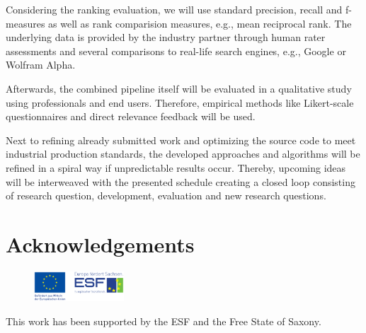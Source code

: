 Considering the ranking evaluation, we will use standard precision, recall and f-measures as well as rank comparision measures, e.g., mean reciprocal rank. 
The underlying data is provided by the industry partner through human rater assessments and several comparisons to real-life search engines, e.g., Google or Wolfram Alpha.

Afterwards, the combined pipeline itself will be evaluated in a qualitative study using professionals and end users.
Therefore, empirical methods like Likert-scale questionnaires and direct relevance feedback will be used.


Next to refining already submitted work and optimizing the source code to meet industrial production standards, the developed approaches and algorithms will be refined in a spiral way if unpredictable results occur.
Thereby, upcoming ideas will be interweaved with the presented schedule creating a closed loop consisting of research question, development, evaluation and new research questions.


\section*{Acknowledgements}
\begin{figure}
 \vspace{-10mm}
 \includegraphics[width=0.3\textwidth]{figures/esf.pdf}
\end{figure}
This work has been supported by the ESF and the Free State of Saxony.

%
%

%

